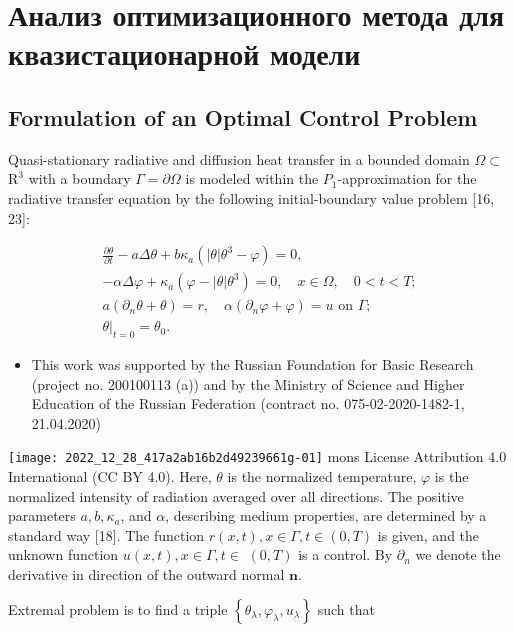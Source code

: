 \section{Анализ оптимизационного метода для квазистационарной модели}\label{sec:ch2/sec2}

\subsection{Formulation of an Optimal Control Problem}
Quasi-stationary radiative and diffusion heat transfer in a bounded domain $\Omega \subset$ $\mathrm{R}^{3}$ with a boundary $\Gamma=\partial \Omega$ is modeled within the $P_{1}$-approximation for the radiative transfer equation by the following initial-boundary value problem [16, 23]:

$$
\begin{gathered}
\frac{\partial \theta}{\partial t}-a \Delta \theta+b \kappa_{a}\left(|\theta| \theta^{3}-\varphi\right)=0, \\
-\alpha \Delta \varphi+\kappa_{a}\left(\varphi-|\theta| \theta^{3}\right)=0, \quad x \in \Omega, \quad 0<t<T ; \\
a\left(\partial_{n} \theta+\theta\right)=r, \quad \alpha\left(\partial_{n} \varphi+\varphi\right)=u \text { on } \Gamma ; \\
\left.\theta\right|_{t=0}=\theta_{0} .
\end{gathered}
$$

\begin{itemize}
  \item This work was supported by the Russian Foundation for Basic Research (project no. 200100113 (a)) and by the Ministry of Science and Higher Education of the Russian Federation (contract no. 075-02-2020-1482-1, 21.04.2020)
\end{itemize}

\texttt{[image: 2022\_12\_28\_417a2ab16b2d49239661g-01]}
mons License Attribution 4.0 International (CC BY 4.0). Here, $\theta$ is the normalized temperature, $\varphi$ is the normalized intensity of radiation averaged over all directions. The positive parameters $a, b, \kappa_{a}$, and $\alpha$, describing medium properties, are determined by a standard way [18]. The function $r(x, t), x \in \Gamma, t \in(0, T)$ is given, and the unknown function $u(x, t), x \in \Gamma, t \in$ $(0, T)$ is a control. By $\partial_{n}$ we denote the derivative in direction of the outward normal $\mathbf{n}$.

Extremal problem is to find a triple $\left\{\theta_{\lambda}, \varphi_{\lambda}, u_{\lambda}\right\}$ such that

